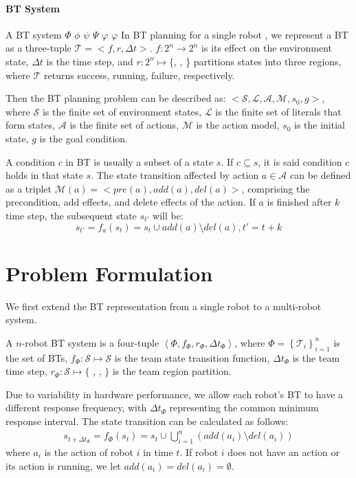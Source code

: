 \documentclass{article}
\begin{document}
\paragraph{BT System}

A BT system $\Phi$ $\phi$ $\psi$ $\Psi$ $\varphi$ $\varphi$
In BT planning for a single robot \cite{cai2021bt}, we represent a BT as a three-tuple $\mathcal{T} = <f, r, \Delta t>$. $f:2^{n}\rightarrow 2^{n}$ is its effect on the environment state, $\Delta t$ is the time step, and $r:2^{n}\mapsto \{ $, , \} partitions states into three regions, where $\mathcal{T}$ returns success, running, failure, respectively.

Then the BT planning problem can be described as: \(<\mathcal{S},\mathcal{L},\mathcal{A},\mathcal{M}, s_0,g>\), where \( \mathcal{S} \) is the finite set of environment states, $\mathcal{L}$ is the finite set of literals that form states, \( \mathcal{A} \) is the finite set of actions, $\mathcal{M}$ is the action model, $s_0$  is the initial state, $g$ is the goal condition. 


A condition $c$ in BT is usually a subset of a state $s$. If $c\subseteq s$, it is said condition $c$ holds in that state $s$. The state transition affected by action $a\in \mathcal{A}$ can be defined as a triplet \( \mathcal{M}(a)=<pre(a),add(a),del(a)> \), comprising the precondition, add effects, and delete effects of the action. If $a$ is finished after $k$ time step, the subsequent state $s_{t'}$ will be:
\begin{equation}\label{eqn:s_f}
	s_{t'}=f_a(s_t)=s_t\cup add(a)\setminus del(a), t'=t + k
\end{equation}


\section{Problem Formulation}
We first extend the BT representation from a single robot to a multi-robot system. 

\begin{definition}[BT System]
A $n$-robot BT system is a four-tuple $\left<\Phi, f_\Phi, r_\Phi, \Delta t_\Phi\right>$, where $\Phi = \left\{ \mathcal{T}_i \right\}_{i=1}^n$ is the set of BTs, $f_\Phi: \mathcal{S} \mapsto \mathcal{S}$ is the team state transition function, $\Delta t_\Phi$ is the team time step, $r_\Phi: \mathcal{S} \mapsto \{$ , ,  $\}$ is the team region partition.
\end{definition}
Due to variability in hardware performance, we allow each robot's BT to have a different response frequency, with $\Delta t_\Phi$ representing the common minimum response interval. The state transition can be calculated as follows:
\begin{align}
    s_{t+\Delta t_\Phi} = f_\Phi(s_t) = s_t \cup \bigcup_{i=1}^n \left( add(a_i) \setminus del(a_i) \right)
\end{align}
where $a_i$ is the action of robot $i$ in time $t$. If robot $i$ does not have an action or its action is running, we let $add(a_i) = del(a_i) = \emptyset$. 
\end{document}

